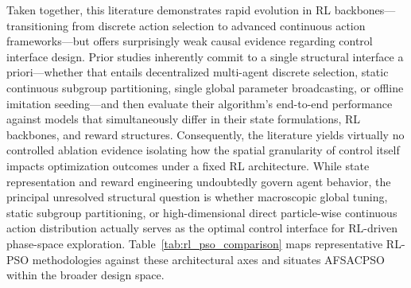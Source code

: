 \documentclass[final,5p,times]{elsarticle}
\begin{document}
Taken together, this literature demonstrates rapid evolution in RL backbones—transitioning from discrete action selection to advanced continuous action frameworks—but offers surprisingly weak causal evidence regarding control interface design. 
Prior studies inherently commit to a single structural interface a priori—whether that entails decentralized multi-agent discrete selection, static continuous subgroup partitioning, single global parameter broadcasting, or offline imitation seeding—and then evaluate their algorithm's end-to-end performance against models that simultaneously differ in their state formulations, RL backbones, and reward structures. 
Consequently, the literature yields virtually no controlled ablation evidence isolating how the spatial granularity of control itself impacts optimization outcomes under a fixed RL architecture. 
While state representation and reward engineering undoubtedly govern agent behavior, the principal unresolved structural question is whether macroscopic global tuning, static subgroup partitioning, or high-dimensional direct particle-wise continuous action distribution actually serves as the optimal control interface for RL-driven phase-space exploration. 
Table~\ref{tab:rl_pso_comparison} maps representative RL-PSO methodologies against these architectural axes and situates AFSACPSO within the broader design space.
\end{document}
